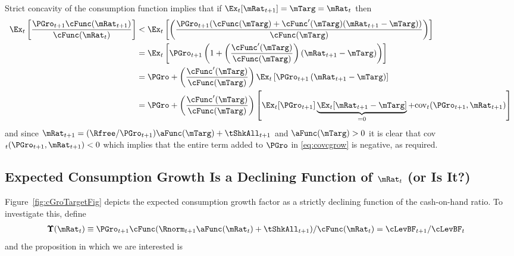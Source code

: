 \documentclass[BufferStockTheory]{subfiles}
\begin{document}
Strict concavity of the consumption function implies that if $\Ex_{t}[{\mRat}_{t+1}] = \mTarg = \mRat_{t}$ then
\begin{equation}\begin{gathered}\begin{aligned}
  \Ex_{t}\left[\frac{{\PGro}_{t+1} \cFunc({\mRat}_{t+1})}{\cFunc(\mRat_{t})}
  \right]  & < \Ex_{t}\left[\left(\frac{{\PGro}_{t+1}
             (\cFunc(\mTarg)+\cFunc^{\prime}(\mTarg)({\mRat}_{t+1}-\mTarg))}{\cFunc(\mTarg)}\right)\right]  \nonumber \\
           & = \Ex_{t}\left[{\PGro}_{t+1} \left(1+\left(\frac{\cFunc^{\prime}(\mTarg)}{%
             \cFunc(\mTarg)}\right)({\mRat}_{t+1}-\mTarg)\right)\right]  \nonumber  \\
           & = \PGro + \left(\frac{\cFunc^{\prime}(\mTarg)}{\cFunc(\mTarg)}\right)\Ex_{t}\left[ {\PGro}_{t+1}\left({\mRat}_{t+1}-\mTarg\right)\right]  \nonumber \\
           & = \PGro + \left(\frac{\cFunc^{\prime}(\mTarg)}{\cFunc(\mTarg)}\right)\left[
             \Ex_{t}[ \PGro_{t+1}]\underbrace{\Ex_{t}[
             {\mRat}_{t+1}-\mTarg]}_{=0}+\mbox{cov}_{t}( {\PGro}_{t+1},{\mRat}_{t+1})\right]
             \label{eq:covcgrow}
\end{aligned}\end{gathered}\end{equation}
and since $\mRat_{t+1} = (\Rfree/\PGro_{t+1}) \aFunc(\mTarg)+\tShkAll_{t+1}$ and
$\aFunc(\mTarg)>0$ it is clear that
cov$_{t}({\PGro}_{t+1},{\mRat}_{t+1})<0$ which implies that
the entire term added to $\PGro$ in \eqref{eq:covcgrow} is negative, as
required.

\hypertarget{dcgdxneg}{}
\subsection{Expected Consumption Growth Is a Declining Function of $\mRat_{t}$ (or Is It?)}
\label{subsec:dcgdxneg}

Figure~\ref{fig:cGroTargetFig} depicts the expected consumption growth factor as a strictly
declining function of the cash-on-hand ratio. To investigate this,
define
\begin{align*}
  \pmb{\Upsilon}(\mRat_{t})  & \equiv  \PGro_{t+1} \cFunc(\Rnorm_{t+1}\aFunc(\mRat_{t})+\tShkAll_{t+1})/\cFunc(\mRat_{t})  = \cLevBF_{t+1}/\cLevBF_{t}
\end{align*}
and the proposition in which we are interested is
\end{document}
